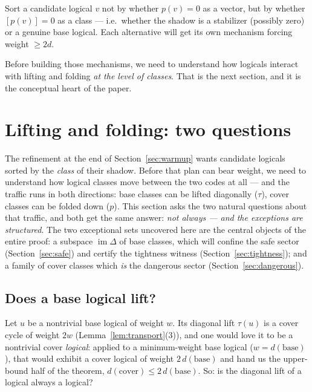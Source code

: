 \documentclass[11pt]{article}
\theoremstyle{plain}
\theoremstyle{definition}
\theoremstyle{remark}
\newcommand{\imD}{\operatorname{im}\Delta}
\newcommand{\base}{\mathrm{base}}
\newcommand{\cov}{\mathrm{cover}}
\begin{document}
\begin{keyidea}
Sort a candidate logical $v$ not by whether $p(v) = 0$ as a vector, but by
whether $[p(v)] = 0$ as a class --- i.e.\ whether the shadow is a stabilizer
(possibly zero) or a genuine base logical. Each alternative will get its own
mechanism forcing weight $\geq 2d$.
\end{keyidea}

Before building those mechanisms, we need to understand how logicals interact
with lifting and folding \emph{at the level of classes}. That is the next
section, and it is the conceptual heart of the paper.

\section{Lifting and folding: two questions}
\label{sec:liftfold}

The refinement at the end of Section~\ref{sec:warmup} wants candidate
logicals sorted by the \emph{class} of their shadow. Before that plan can
bear weight, we need to understand how logical classes move between the two
codes at all --- and the traffic runs in both directions: base classes can
be lifted diagonally ($\tau$), cover classes can be folded down ($p$). This
section asks the two natural questions about that traffic, and both get the
same answer: \emph{not always --- and the exceptions are structured}. The
two exceptional sets uncovered here are the central objects of the entire
proof: a subspace $\imD$ of base classes, which will confine the safe
sector (Section~\ref{sec:safe}) and certify the tightness witness
(Section~\ref{sec:tightness}); and a family of cover classes which
\emph{is} the dangerous sector (Section~\ref{sec:dangerous}).

\subsection{Does a base logical lift?}
\label{sec:lift}

Let $u$ be a nontrivial base logical of weight $w$. Its diagonal lift
$\tau(u)$ is a cover cycle of weight $2w$ (Lemma~\ref{lem:transport}(3)),
and one would love it to be a nontrivial cover \emph{logical}: applied to a
minimum-weight base logical ($w = d(\base)$), that would exhibit a cover
logical of weight $2\,d(\base)$ and hand us the upper-bound half of the
theorem, $d(\cov) \leq 2\,d(\base)$. So: is the diagonal lift of a logical
always a logical?
\end{document}
